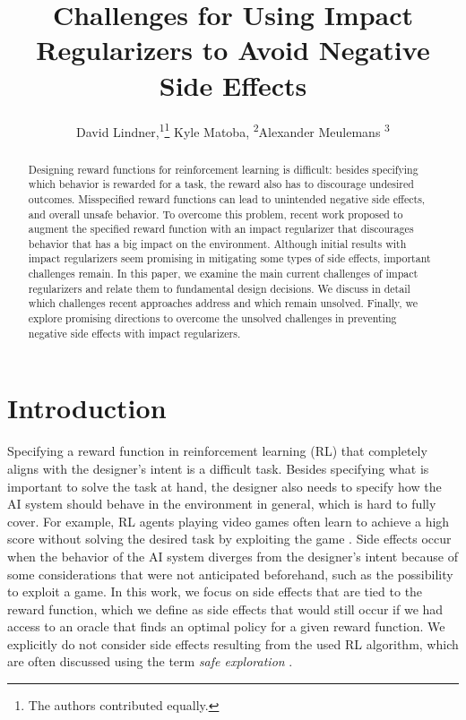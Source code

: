 \documentclass[letterpaper]{article} %
\title{Challenges for Using Impact Regularizers to Avoid Negative Side Effects}
\author {
    David Lindner,\textsuperscript{\rm 1}\thanks{The authors contributed equally.}
    Kyle Matoba, \textsuperscript{\rm 2}\footnotemark[1]
    Alexander Meulemans \textsuperscript{\rm 3}\footnotemark[1] \\
}
\begin{document}
\maketitle
\begin{abstract}
Designing reward functions for reinforcement learning is difficult: besides specifying which behavior is rewarded for a task, the reward also has to discourage undesired outcomes. Misspecified reward functions can lead to unintended negative side effects, and overall unsafe behavior. To overcome this problem, recent work proposed to augment the specified reward function with an impact regularizer that discourages behavior that has a big impact on the environment.
Although initial results with impact regularizers seem promising in mitigating some types of side effects, important challenges remain. In this paper, we examine the main current challenges of impact regularizers and relate them to fundamental design decisions. We discuss in detail which challenges recent approaches address and which remain unsolved. Finally, we explore promising directions to overcome the unsolved challenges in preventing negative side effects with impact regularizers.

\end{abstract}

\section{Introduction}
\label{sec:introduction}
Specifying a reward function in reinforcement learning (RL) that completely aligns with the designer's intent is a difficult task. Besides specifying what is important to solve the task at hand, the designer also needs to specify how the AI system should behave in the environment in general, which is hard to fully cover. For example, RL agents playing video games often learn to achieve a high score without solving the desired task by exploiting the game \citep[e.g.][]{Saunders2017}.
Side effects occur when the behavior of the AI system diverges from the designer's intent because of some considerations that were not anticipated beforehand, such as the possibility to exploit a game. In this work, we focus on side effects that are tied to the reward function, which we define as side effects that would still occur if we had access to an oracle that finds an optimal policy for a given reward function. We explicitly do not consider side effects resulting from the used RL algorithm, which are often discussed using the term \emph{safe exploration} \citep{garcia2015comprehensive}.
\end{document}
